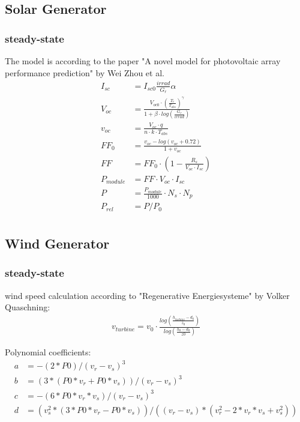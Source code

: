 \subsection{Solar Generator}

\subsubsection{steady-state}
The model is according to the paper "A novel model for photovoltaic array performance prediction" by Wei Zhou et al. 
\begin{align}
	I_{sc} &= I_{sc0} \frac{irrad}{G_r} \alpha \\
    V_{oc} &= \frac{V_{oc0} \cdot \left( \frac{T_r}{T_{abs}} \right)^\gamma}{1 + \beta \cdot log \left(\frac{G_r}{irrad} \right) } \\
    v_{oc} &= \frac{V_{oc} \cdot q}{n \cdot k \cdot T_{abs}} \\
    FF_0 &= \frac{v_{oc} - log(v_{oc} + 0.72)}{1 + v_{oc}} \\
    FF &= FF_0 \cdot \left( 1 - \frac{R_s}{V_{oc} \cdot I_{sc}} \right) \\
    P_{module} &= FF \cdot V_{oc} \cdot I_{sc} \\
    P &= \frac{P_{module}}{1000} \cdot N_s \cdot N_p \\
    P_{rel} &= P/P_0 \\
\end{align}

\subsection{Wind Generator}
\subsubsection{steady-state}

wind speed calculation according to "Regenerative Energiesysteme" by Volker Quaschning:
\begin{align}
	v_{turbine} = v_{0} \cdot \frac{log \left( \frac{h_{turbine}-d_0}{z_0} \right) } {log \left( \frac{h_0-d_0} {z0} \right)}
\end{align}

Polynomial coefficients:
\begin{align}
	a &= -(2*P0)/(v_r - v_s)^3 \\
	b &= (3*(P0*v_r + P0*v_s))/(v_r - v_s)^3 \\
	c &= -(6*P0*v_r*v_s)/(v_r - v_s)^3 \\
	d &= (v_s^2*(3*P0*v_r - P0*v_s))/((v_r - v_s)*(v_r^2 - 2*v_r*v_s + v_s^2)) \\
\end{align}


